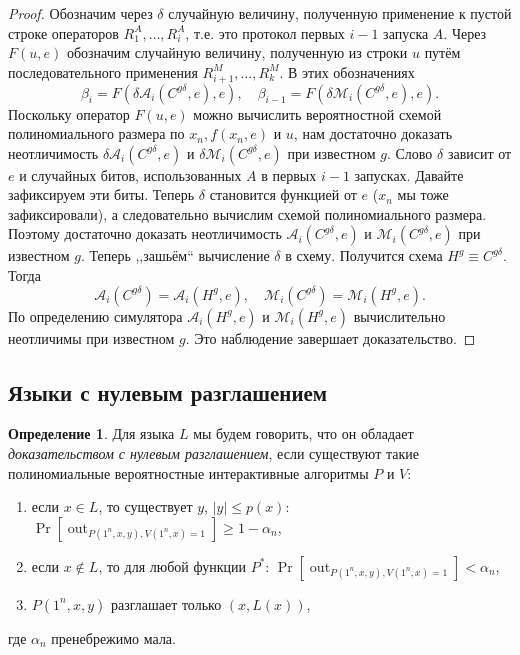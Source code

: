 \documentclass[12pt,a4paper]{article}
\DeclareMathOperator{\out}{out}
\theoremstyle{definition}
\newtheorem{definition}{Определение}[section]
\theoremstyle{plain}
\theoremstyle{remark}
\begin{document}
\begin{proof}
Обозначим через $\delta$ случайную величину, полученную применение к пустой 
строке операторов $R^A_1, \dotsc, R^A_i$, т.е. это протокол первых $i-1$ запуска $A$.
Через $F(u,e)$ обозначим случайную 
величину, полученную из строки $u$ путём последовательного применения 
$R^M_{i+1}, \dotsc, R^M_k$. В этих обозначениях
$$\beta_i     = F(\delta \mathcal A_i(C^{g\delta},e),e), \quad 
  \beta_{i-1} = F(\delta \mathcal M_i(C^{g\delta},e),e).$$
Поскольку оператор $F(u,e)$ можно вычислить вероятностной схемой 
полиномиального размера по $x_n, f(x_n, e)$ и $u$, 
нам достаточно доказать неотличимость $\delta \mathcal A_i(C^{g\delta},e)$ и 
$\delta \mathcal M_i(C^{g\delta},e)$ при известном $g$. Слово $\delta$ зависит 
от $e$ и случайных битов, использованных $A$ в первых $i-1$ запусках. 
Давайте зафиксируем эти биты. Теперь $\delta$ становится
функцией от $e$ ($x_n$ мы тоже зафиксировали), а следовательно вычислим схемой полиномиального размера.
Поэтому достаточно доказать неотличимость $\mathcal A_i(C^{g\delta},e)$ и $\mathcal M_i(C^{g\delta},e)$ при известном $g$. Теперь ,,зашьём`` вычисление $\delta$ в схему. Получится схема $H^g \equiv C^{g\delta}$.
Тогда $$\mathcal A_i(C^{g\delta}) = \mathcal A_i(H^{g},e),\quad \mathcal M_i(C^{g\delta}) = \mathcal M_i(H^{g},e).$$
По определению симулятора $\mathcal A_i(H^{g},e)$ и $\mathcal M_i(H^{g},e)$ вычислительно неотличимы при известном $g$.
Это наблюдение завершает доказательство.
\end{proof}

\subsection{Языки с нулевым разглашением}

\begin{definition}
Для языка $L$ мы будем говорить, что он обладает \emph{доказательством с нулевым разглашением},
если существуют такие полиномиальные вероятностные интерактивные алгоритмы $P$ и $V$:
\begin{enumerate}
\item если $x\in L$, то существует $y$, $|y|\le p(x)$: $\Pr[\out_{P(1^n, x, y), V(1^n, x) = 1}]\ge 1-\alpha_n$,
\item если $x\not\in L$, то для любой функции $P^*$: $\Pr[\out_{P(1^n, x, y), V(1^n, x) = 1}] < \alpha_n$,
\item $P(1^n, x, y)$ разглашает только $(x, L(x))$,
\end{enumerate}
где $\alpha_n$ пренебрежимо мала.
\end{definition}
\end{document}
